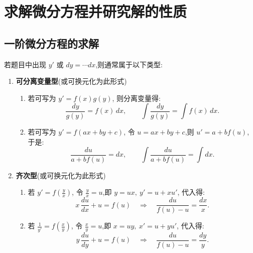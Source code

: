 \section{求解微分方程并研究解的性质}
\subsection{一阶微分方程的求解}
\DTwoThree

若题目中出现 $y'$ 或 $dy=\cdots dx$,则通常属于以下类型:

\begin{enumerate}
    \item \textbf{可分离变量型}(或可换元化为此形式)
          \begin{enumerate}
              \item 若可写为 $y' = f(x)g(y)$,
                    则分离变量得:
                    \[
                        \frac{dy}{g(y)} = f(x)\,dx,
                        \qquad
                        \int \frac{dy}{g(y)} = \int f(x)\,dx.
                    \]

              \item 若可写为 $y' = f(ax+by+c)$,
                    令 $u=ax+by+c$,则 $u' = a + b f(u)$,
                    于是:
                    \[
                        \frac{du}{a + b f(u)} = dx,
                        \qquad
                        \int \frac{du}{a + b f(u)} = \int dx.
                    \]
          \end{enumerate}

    \item \textbf{齐次型}(或可换元化为此形式)
          \begin{enumerate}
              \item 若 $y' = f\!\left(\frac{y}{x}\right)$,
                    令 $\displaystyle \frac{y}{x} = u$,即 $y=ux,\ y' = u + x u'$,
                    代入得:
                    \[
                        x\,\frac{du}{dx} + u = f(u)
                        \quad\Rightarrow\quad
                        \frac{du}{f(u)-u} = \frac{dx}{x}.
                    \]

              \item 若 $\displaystyle \frac{1}{y'} = f\!\left(\frac{x}{y}\right)$,
                    令 $\displaystyle \frac{x}{y} = u$,即 $x=uy,\ x' = u + y u'$,
                    代入得:
                    \[
                        y\,\frac{du}{dy} + u = f(u)
                        \quad\Rightarrow\quad
                        \frac{du}{f(u)-u} = \frac{dy}{y}.
                    \]


\end{enumerate}
\end{enumerate}
